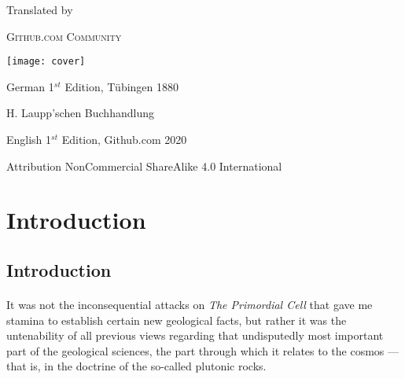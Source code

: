 \documentclass[a4paper, 11pt, oneside]{article}
\begin{document}
\begin{titlepage}
	\vspace{1\baselineskip} %

	Translated by
	
	{\scshape\Large Github.com Community \\ } %
			
	\vspace{1\baselineskip} %
	
	
	\texttt{[image: cover]}
	
		
	\vspace{1\baselineskip} %
	
	German 1$^{st}$ Edition, Tübingen 1880 %
	
	{\small H. Laupp'schen Buchhandlung } %

	\vspace{1\baselineskip} %

    English 1$^{st}$ Edition, Github.com 2020 %
	
	{\small Attribution NonCommercial ShareAlike 4.0 International } %
\end{titlepage}
\setlength{\parskip}{2mm plus1mm minus1mm}
\setcounter{tocdepth}{3}
\setcounter{secnumdepth}{3}
\tableofcontents
\clearpage
\section{Introduction}
\subsection{Introduction}
\paragraph{}
It was not the inconsequential attacks on \emph{The Primordial Cell} that gave me stamina to establish certain new geological facts, but rather it was the untenability of all previous views regarding that undisputedly most important part of the geological sciences, the part through which it relates to the cosmos — that is, in the doctrine of the so-called plutonic rocks.
\end{document}
